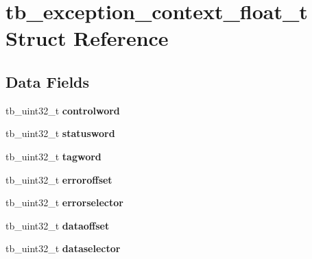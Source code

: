 \hypertarget{structtb__exception__context__float__t}{\section{tb\-\_\-exception\-\_\-context\-\_\-float\-\_\-t Struct Reference}
\label{structtb__exception__context__float__t}
}
\subsection*{Data Fields}
\begin{DoxyCompactItemize}
\item 
\hypertarget{structtb__exception__context__float__t_a4a15887818acd7f5181ac8fce9467a05}{tb\-\_\-uint32\-\_\-t {\bfseries controlword}}\label{structtb__exception__context__float__t_a4a15887818acd7f5181ac8fce9467a05}

\item 
\hypertarget{structtb__exception__context__float__t_ae3fd8f94ab312bd5a8fd6c67315a3119}{tb\-\_\-uint32\-\_\-t {\bfseries statusword}}\label{structtb__exception__context__float__t_ae3fd8f94ab312bd5a8fd6c67315a3119}

\item 
\hypertarget{structtb__exception__context__float__t_a41f42e11a29e46e4ec19111815f48ef7}{tb\-\_\-uint32\-\_\-t {\bfseries tagword}}\label{structtb__exception__context__float__t_a41f42e11a29e46e4ec19111815f48ef7}

\item 
\hypertarget{structtb__exception__context__float__t_a7d8abc7236548f9c1ba6548e3780553a}{tb\-\_\-uint32\-\_\-t {\bfseries erroroffset}}\label{structtb__exception__context__float__t_a7d8abc7236548f9c1ba6548e3780553a}

\item 
\hypertarget{structtb__exception__context__float__t_a09cfe14c9eecd5a8b87749d78bbd8dc3}{tb\-\_\-uint32\-\_\-t {\bfseries errorselector}}\label{structtb__exception__context__float__t_a09cfe14c9eecd5a8b87749d78bbd8dc3}

\item 
\hypertarget{structtb__exception__context__float__t_a3905e097710a79a90973095c7d6b96cb}{tb\-\_\-uint32\-\_\-t {\bfseries dataoffset}}\label{structtb__exception__context__float__t_a3905e097710a79a90973095c7d6b96cb}

\item 
\hypertarget{structtb__exception__context__float__t_abda02b7f8532e78b263de6853e45bb5b}{tb\-\_\-uint32\-\_\-t {\bfseries dataselector}}\label{structtb__exception__context__float__t_abda02b7f8532e78b263de6853e45bb5b}


\end{DoxyCompactItemize}
